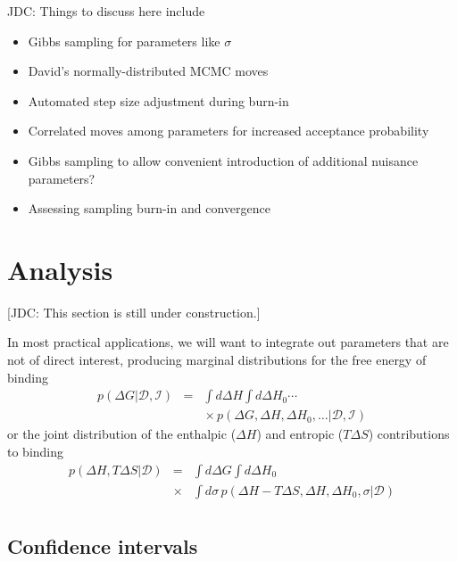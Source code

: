 \documentclass[aps,pre,twocolumn,nofootinbib,superscriptaddress,linenumbers]{revtex4-1}
\begin{document}
\color{red}
JDC: Things to discuss here include
\begin{itemize}
  \item Gibbs sampling for parameters like $\sigma$
  \item David's normally-distributed MCMC moves
  \item Automated step size adjustment during burn-in
  \item Correlated moves among parameters for increased acceptance probability
  \item Gibbs sampling to allow convenient introduction of additional nuisance parameters?
  \item Assessing sampling burn-in and convergence
\end{itemize}
\color{black}

\section{Analysis}
\label{section:analysis}

{\color{red}[JDC: This section is still under construction.]}

In most practical applications, we will want to integrate out parameters that are not of direct interest, producing marginal distributions for the free energy of binding
\begin{eqnarray}
p(\Delta G | \mathcal{D},\mathcal{I}) &=& \int d\Delta H \int d\Delta H_0 \cdots \nonumber \\
&& \mbox{} \times p(\Delta G, \Delta H, \Delta H_0, \ldots| \mathcal{D}, \mathcal{I}) \nonumber 
\end{eqnarray}
or the joint distribution of the enthalpic ($\Delta H$) and entropic ($T \Delta S$) contributions to binding
\begin{eqnarray}
p(\Delta H, T \Delta S | \mathcal{D}) &=& \int d\Delta G \int d\Delta H_0 \nonumber \\ 
&\times& \int d\sigma \, p(\Delta H - T\Delta S, \Delta H, \Delta H_0, \sigma | \mathcal{D}) \nonumber \\
\end{eqnarray}

\subsection{Confidence intervals}
\end{document}
